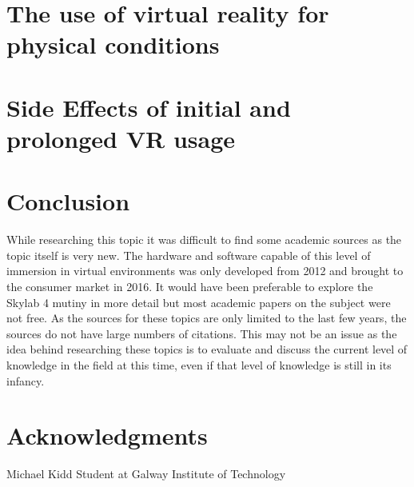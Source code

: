 \documentclass[10pt,journal,compsoc]{IEEEtran}
\begin{document}
	\section{The use of virtual reality for physical conditions}
	
	
	\section{Side Effects of initial and prolonged VR usage}
	
	
	\section{Conclusion}
	While researching this topic it was difficult to find some academic sources as the topic itself is very new. The hardware and software capable of this level of immersion in virtual environments was only developed from 2012 and brought to the consumer market in 2016. It would have been preferable to explore the Skylab 4 mutiny in more detail but most academic papers on the subject were not free. As the sources for these topics are only limited to the last few years, the sources do not have large numbers of citations. This may not be an issue as the idea behind researching these topics is to evaluate and discuss the current level of knowledge in the field at this time, even if that level of knowledge is still in its infancy. 

	\section{Acknowledgments}

	
	\begin{IEEEbiography}{Michael Kidd}
	Student at Galway Institute of Technology
		
	\end{IEEEbiography}
\end{document}
